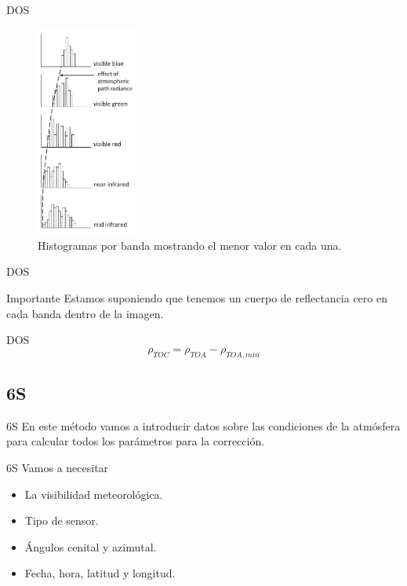 \documentclass[]{beamer}
\begin{document}
\begin{frame}{DOS}
  \begin{figure}
  \centering
  \includegraphics[width=0.30\textwidth]{imagenes/dos.png}
  \caption{Histogramas por banda mostrando el menor valor en cada una.}
  \end{figure}
\end{frame}

\begin{frame}{DOS}
  \begin{alertblock}{Importante}
    Estamos suponiendo que tenemos un cuerpo de reflectancia cero en cada banda dentro de la imagen.
  \end{alertblock}
\end{frame}

\begin{frame}{DOS}
  \begin{equation}
    \rho_{TOC} = \rho_{TOA} - \rho_{TOA,min}
  \end{equation}
\end{frame}

\subsection{6S}
\begin{frame}{6S}
  En este método vamos a introducir datos sobre las condiciones de la atmósfera para calcular todos los parámetros para la corrección.
\end{frame}

\begin{frame}{6S}
  Vamos a necesitar
  \begin{itemize}
    \item La visibilidad meteorológica.
    \item Tipo de sensor.
    \item Ángulos cenital y azimutal.
    \item Fecha, hora, latitud y longitud.
  \end{itemize}
\end{frame}
\end{document}
